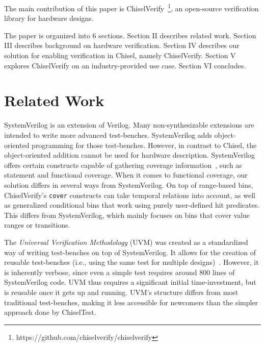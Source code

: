 \documentclass[conference]{IEEEtran}
\newcommand{\todo}[1]{{\color{olive} TODO: #1}}
\begin{document}
The main contribution of this paper is ChiselVerify~\footnote{https://github.com/chiselverify/chiselverify}, an open-source verification library for hardware designs.

The paper is organized into 6 sections.
Section II describes related work.
Section III describes background on hardware verification.
Section IV describes our solution for enabling verification in Chisel, namely ChiselVerify.
Section V explores ChiselVerify on an industry-provided use case.
Section VI concludes.

\section{Related Work}

SystemVerilog is an extension of Verilog. Many non-synthesizable extensions are intended
to write more advanced test-benches. SystemVerilog adds object-oriented programming
for those test-benches. However, in contrast to Chisel, the object-oriented addition cannot be
used for hardware description.
SystemVerilog offers certain constructs capable of gathering coverage information~\cite{spear2008systemverilog}, such as statement and functional coverage. 
When it comes to functional coverage, our solution differs in several ways from SystemVerilog. 
On top of range-based bins, ChiselVerify's \texttt{cover} constructs can take temporal relations into account, as well as generalized conditional bins that work using purely user-defined hit predicates.
This differs from SystemVerilog, which mainly focuses on bins that cover value ranges or transitions. 

The \textit{Universal Verification Methodology} (UVM) was created as a standardized way of writing test-benches on top of SystemVerilog. 
It allows for the creation of reusable test-benches (i.e., using the same test for multiple designs)~\cite{uvm2015}. 
However, it is inherently verbose, since even a simple test requires around 800 lines of SystemVerilog code. 
UVM thus requires a significant initial time-investment, but is reusable once it gets up and running. 
UVM's structure differs from most traditional test-benches, making it less accessible for newcomers than the simpler approach done by ChiselTest.
\end{document}
